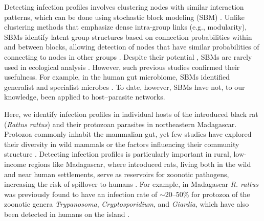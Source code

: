 \documentclass[oneside, a4paper, onecolumn, 11pt]{article}
\begin{document}
Detecting infection profiles involves clustering nodes with similar interaction patterns, which can be done using stochastic block modeling (SBM) \citep{Rosvall2018-jg}. Unlike clustering methods that emphasize dense intra-group links (e.g., modularity), SBMs identify latent group structures based on connection probabilities within and between blocks, allowing detection of nodes that have similar probabilities of connecting to nodes in other groups \citep{Rosvall2018-jg, Allesina2009-ra}. Despite their potential \citep{Leger2015-xn}, SBMs are rarely used in ecological analysis \citep{Baskerville2011-pb, Cobo-Lopez2022-rt, Galai2024-en, Miele2020-ba}. However, such previous studies confirmed their usefulness. For example, in the human gut microbiome, SBMs identified generalist and specialist microbes \citep{Cobo-Lopez2022-rt}. To date, however, SBMs have not, to our knowledge, been applied to host–parasite networks.

Here, we identify infection profiles in individual hosts of the introduced black rat (\textit{Rattus rattus}) and their protozoan parasites in northeastern Madagascar. Protozoa commonly inhabit the mammalian gut, yet few studies have explored their diversity in wild mammals or the factors influencing their community structure \citep{Hunter-Barnett2024-pe}. Detecting infection profiles is particularly important in rural, low-income regions like Madagascar, where introduced rats, living both in the wild and near human settlements, serve as reservoirs for zoonotic pathogens, increasing the risk of spillover to humans \citep{Rahelinirina2010-li,Spencer2020-gm}. For example, in Madagascar \textit{R. rattus} was previously found to have an infection rate of $\sim$20–50\% for protozoa of the zoonotic genera \textit{Trypanosoma}, \textit{Cryptosporidium}, and \textit{Giardia}, which have also been detected in humans on the island \citep{Rasoanoro2019-vo,Spencer2020-gm}.
\end{document}
